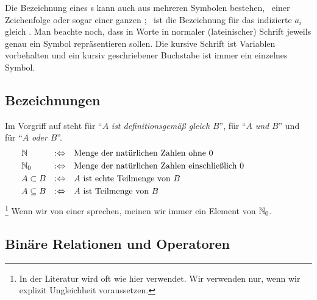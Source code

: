 Die Bezeichnung eines s kann auch aus mehreren Symbolen bestehen, \textdh\ einer Zeichenfolge oder sogar einer ganzen ; \textzB\ ist die Bezeichnung für das indizierte  $a_i$ gleich .
Man beachte noch, dass in  Worte in normaler (lateinischer) Schrift jeweils genau ein Symbol repräsentieren sollen.
Die kursive Schrift ist Variablen vorbehalten und ein kursiv geschriebener Buchstabe ist immer ein einzelnes Symbol.

\subsection{Bezeichnungen}%
\label{sub:Bezeichnungen}

Im Vorgriff auf  steht  für \enquote{$A$ \emph{ist definitionsgemäß gleich} $B$},  für \enquote{$A$ \emph{und} $B$} und  für \enquote{$A$ \emph{oder} $B$}.
\begin{align}
	& \mathbb{N}          & :\Leftrightarrow & \quad
	\text{Menge der natürlichen Zahlen ohne           $0$} \\
	& \mathbb{N}_0         & :\Leftrightarrow & \quad
	\text{Menge der natürlichen Zahlen einschließlich $0$} \\
	& A \subset B   & :\Leftrightarrow & \quad
	\text{$A$ ist echte Teilmenge von $B$}                 \\
	& A \subseteq B & :\Leftrightarrow & \quad
	\text{$A$ ist       Teilmenge von $B$}                 &&&&&&&&&&
\end{align}%
\footnote{%
	In der Literatur wird \chrqt{$\subset$} oft wie hier \chrqt{$\subseteq$} verwendet.
	Wir verwenden \chrqt{$\subset$} nur, wenn wir explizit Ungleichheit voraussetzen.
}
Wenn wir von einer  sprechen, meinen wir immer ein Element von $\mathbb{N}_0$.

\subsection{Binäre Relationen und Operatoren}%
\label{sub:binär}

